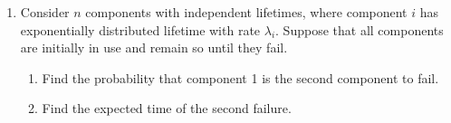 \documentclass{article}
\begin{document}
\begin{enumerate}
\item Consider $n$ components with independent lifetimes, where component $i$
has exponentially distributed lifetime with rate $\lambda_i$. Suppose that all
components are initially in use and remain so until they fail.

  \begin{enumerate}

  \item Find the probability that component 1 is the second component to fail.

  \item Find the expected time of the second failure.

  \end{enumerate}

\end{enumerate}
\end{document}
